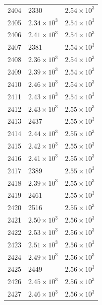 \begin{table}[H]
\begin{tabular}{lll}
2404 & 2330 & $\displaystyle 2.54 \times 10^{3}$ \\
2405 & $\displaystyle 2.34 \times 10^{3}$ & $\displaystyle 2.54 \times 10^{3}$ \\
2406 & $\displaystyle 2.41 \times 10^{3}$ & $\displaystyle 2.54 \times 10^{3}$ \\
2407 & 2381 & $\displaystyle 2.54 \times 10^{3}$ \\
2408 & $\displaystyle 2.36 \times 10^{3}$ & $\displaystyle 2.54 \times 10^{3}$ \\
2409 & $\displaystyle 2.39 \times 10^{3}$ & $\displaystyle 2.54 \times 10^{3}$ \\
2410 & $\displaystyle 2.46 \times 10^{3}$ & $\displaystyle 2.54 \times 10^{3}$ \\
2411 & $\displaystyle 2.43 \times 10^{3}$ & $\displaystyle 2.54 \times 10^{3}$ \\
2412 & $\displaystyle 2.43 \times 10^{3}$ & $\displaystyle 2.55 \times 10^{3}$ \\
2413 & 2437 & $\displaystyle 2.55 \times 10^{3}$ \\
2414 & $\displaystyle 2.44 \times 10^{3}$ & $\displaystyle 2.55 \times 10^{3}$ \\
2415 & $\displaystyle 2.42 \times 10^{3}$ & $\displaystyle 2.55 \times 10^{3}$ \\
2416 & $\displaystyle 2.41 \times 10^{3}$ & $\displaystyle 2.55 \times 10^{3}$ \\
2417 & 2389 & $\displaystyle 2.55 \times 10^{3}$ \\
2418 & $\displaystyle 2.39 \times 10^{3}$ & $\displaystyle 2.55 \times 10^{3}$ \\
2419 & 2461 & $\displaystyle 2.55 \times 10^{3}$ \\
2420 & 2516 & $\displaystyle 2.55 \times 10^{3}$ \\
2421 & $\displaystyle 2.50 \times 10^{3}$ & $\displaystyle 2.56 \times 10^{3}$ \\
2422 & $\displaystyle 2.53 \times 10^{3}$ & $\displaystyle 2.56 \times 10^{3}$ \\
2423 & $\displaystyle 2.51 \times 10^{3}$ & $\displaystyle 2.56 \times 10^{3}$ \\
2424 & $\displaystyle 2.49 \times 10^{3}$ & $\displaystyle 2.56 \times 10^{3}$ \\
2425 & 2449 & $\displaystyle 2.56 \times 10^{3}$ \\
2426 & $\displaystyle 2.45 \times 10^{3}$ & $\displaystyle 2.56 \times 10^{3}$ \\
2427 & $\displaystyle 2.46 \times 10^{3}$ & $\displaystyle 2.56 \times 10^{3}$ \\

\end{tabular}
\end{table}
